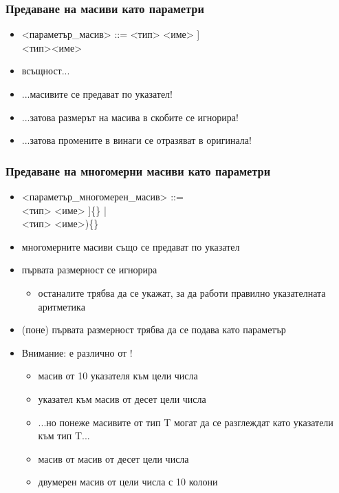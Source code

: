 \documentclass[alsotrans]{beamerswitch}
\begin{document}
\begin{frame}
  \frametitle{Предаване на масиви като параметри}

  \small
  \begin{itemize}[<+->]
  \item{} <параметър\_масив> ::= <тип> <име> \tta[[<константен\_израз>]\tta]\\
    \hspace{26ex}<тип>\tta* <име>
  \item всъщност...
  \item ...масивите се предават \alert{по указател}!
  \item ...затова размерът на масива в скобите се игнорира!
  \item ...затова промените в винаги се отразяват в оригинала!
  \end{itemize}
\end{frame}

\begin{frame}
  \frametitle{Предаване на многомерни масиви като параметри}

  \small
  \begin{itemize}[<+->]
  \item{} <параметър\_многомерен\_масив> ::= \\
    \hspace{10ex}<тип> <име> \tta[[<константа>]\tta]\{\} |\\
    \hspace{10ex}<тип> \tta{(*}<име>\tta)\{\}
    \item многомерните масиви също се предават по указател
    \item първата размерност се игнорира
      \begin{itemize}
      \item останалите трябва да се укажат, за да работи правилно указателната аритметика
      \end{itemize}
    \item (поне) първата размерност трябва да се подава като параметър
    \item \alert{Внимание:}  \alert{е различно от}
      !
      \begin{itemize}
      \item {} \eqv масив от 10 указателя към цели числа
      \item {} \eqv указател към масив от десет цели
        числа
      \item ...но понеже масивите от тип T могат да се разглеждат като
        указатели към тип T...
      \item {} \eqv масив от масив от десет цели числа
      \item {} \eqv двумерен масив от цели числа с 10
        колони
      \end{itemize}
  \end{itemize}
\end{frame}
\end{document}
